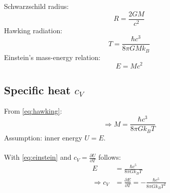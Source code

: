 Schwarzschild radius:
\begin{equation}
    R=\frac{2GM}{c^2}
    \label{eq:schwarzschild}
\end{equation}
Hawking radiation:
\begin{equation}
    T=\frac{\hbar c^3}{8\pi GMk_B}
    \label{eq:hawking}
\end{equation}
Einstein's mass-energy relation:
\begin{equation}
    E=Mc^2
    \label{eq:einstein}
\end{equation}

\subsection{Specific heat $c_V$}
From \autoref{eq:hawking}:
\begin{equation}
    \Rightarrow M=\frac{\hbar c^3}{8\pi Gk_BT}
\end{equation}
Assumption: inner energy $U=E$. \\
\\
With \autoref{eq:einstein} and $c_V=\frac{\partial U}{\partial T}$ follows:
\begin{align}
    E&=\frac{\hbar c^5}{8\pi Gk_BT} \\
    \Rightarrow c_V&=\frac{\partial E}{\partial T}
    =-\frac{\hbar c^5}{8\pi Gk_BT^2}
\end{align}

